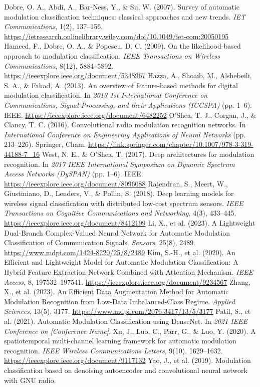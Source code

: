 \documentclass[conference]{IEEEtran}
\begin{document}
\begin{thebibliography}{00}
 Dobre, O. A., Abdi, A., Bar-Ness, Y., \& Su, W. (2007). Survey of automatic modulation classification techniques: classical approaches and new trends. \emph{IET Communications}, 1(2), 137--156. \url{https://ietresearch.onlinelibrary.wiley.com/doi/10.1049/iet-com:20050195}
 Hameed, F., Dobre, O. A., \& Popescu, D. C. (2009). On the likelihood-based approach to modulation classification. \emph{IEEE Transactions on Wireless Communications}, 8(12), 5884--5892. \url{https://ieeexplore.ieee.org/document/5348967}
 Hazza, A., Shoaib, M., Alshebeili, S. A., \& Fahad, A. (2013). An overview of feature-based methods for digital modulation classification. In \emph{2013 1st International Conference on Communications, Signal Processing, and their Applications (ICCSPA)} (pp. 1--6). IEEE. \url{https://ieeexplore.ieee.org/document/6482252}
 O'Shea, T. J., Corgan, J., \& Clancy, T. C. (2016). Convolutional radio modulation recognition networks. In \emph{International Conference on Engineering Applications of Neural Networks} (pp. 213--226). Springer, Cham. \url{https://link.springer.com/chapter/10.1007/978-3-319-44188-7_16}
 West, N. E., \& O'Shea, T. (2017). Deep architectures for modulation recognition. In \emph{2017 IEEE International Symposium on Dynamic Spectrum Access Networks (DySPAN)} (pp. 1--6). IEEE. \url{https://ieeexplore.ieee.org/document/8096088}
 Rajendran, S., Meert, W., Giustiniano, D., Lenders, V., \& Pollin, S. (2018). Deep learning models for wireless signal classification with distributed low-cost spectrum sensors. \emph{IEEE Transactions on Cognitive Communications and Networking}, 4(3), 433--445. \url{https://ieeexplore.ieee.org/document/8412199}
 Li, X., et al. (2023). A Lightweight Dual-Branch Complex-Valued Neural Network for Automatic Modulation Classification of Communication Signals. \emph{Sensors}, 25(8), 2489. \url{https://www.mdpi.com/1424-8220/25/8/2489}
 Kim, S.-H., et al. (2020). An Efficient and Lightweight Model for Automatic Modulation Classification: A Hybrid Feature Extraction Network Combined with Attention Mechanism. \emph{IEEE Access}, 8, 197532--197541. \url{https://ieeexplore.ieee.org/document/9234567}
 Zhang, X., et al. (2023). An Efficient Data Augmentation Method for Automatic Modulation Recognition from Low-Data Imbalanced-Class Regime. \emph{Applied Sciences}, 13(5), 3177. \url{https://www.mdpi.com/2076-3417/13/5/3177}
 Patil, S., et al. (2021). Automatic Modulation Classification using DenseNet. In \emph{2021 IEEE Conference on [Conference Name]}.
 Xu, J., Luo, C., Parr, G., \& Luo, Y. (2020). A spatiotemporal multi-channel learning framework for automatic modulation recognition. \emph{IEEE Wireless Communications Letters}, 9(10), 1629--1632. \url{https://ieeexplore.ieee.org/document/9117132}
 Yao, J., et al. (2019). Modulation classification based on denoising autoencoder and convolutional neural network with GNU radio.
\end{thebibliography}
\end{document}
